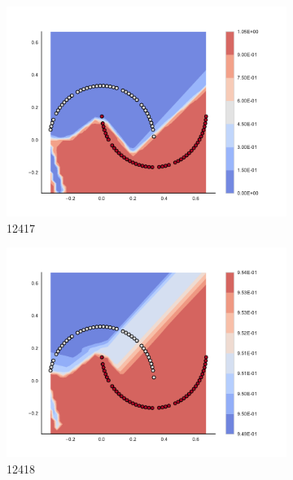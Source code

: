 \begin{figure}[h]
\begin{subfigure}[b]{0.09\textwidth}
    \includegraphics[clip, trim=2.35cm 1.75cm 4.5cm 0cm,width=\textwidth]{img/convergence/12417.pdf}
    \caption{12417}
    \label{fig:convergence_12417}
\end{subfigure}
%
\begin{subfigure}[b]{0.09\textwidth}
    \includegraphics[clip, trim=2.35cm 1.75cm 4.5cm 0cm,width=\textwidth]{img/convergence/12418.pdf}
    \caption{12418}
    \label{fig:convergence_12418}
\end{subfigure}
%
\begin{subfigure}[b]{0.09\textwidth}

\end{subfigure}
\end{figure}
